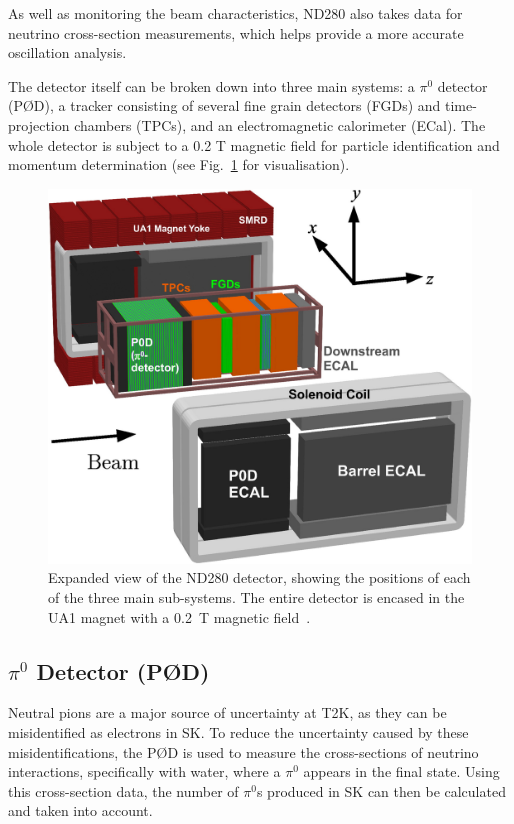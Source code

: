 \documentclass[aps,pra,12pt,notitlepage,tightenlines]{revtex4-1}
\begin{document}
As well as monitoring the beam characteristics, ND280 also takes data for neutrino cross-section measurements, which helps provide a more accurate oscillation analysis. 

The detector itself can be broken down into three main systems: a $\pi^0$ detector (P\O D), a tracker consisting of several fine grain detectors (FGDs) and time-projection chambers (TPCs), and an electromagnetic calorimeter (ECal). The whole detector is subject to a 0.2 T magnetic field for particle identification and momentum determination (see Fig.\ \ref{fig:ND} for visualisation).
\begin{figure}
 \includegraphics[scale=1]{ND280.png}
 \caption{Expanded view of the ND280 detector, showing the positions of each of the three main sub-systems. The entire detector is encased in the UA1 magnet with a 0.2~T magnetic field~\cite{ABE2011106}.}
 \label{fig:ND}
\end{figure} 

\subsection{$\pi^0$ Detector (P\O D)}
Neutral pions are a major source of uncertainty at T2K, as they can be misidentified as electrons in SK. To reduce the uncertainty caused by these misidentifications, the P\O D is used to measure the cross-sections of neutrino interactions, specifically with water, where a $\pi^0$ appears in the final state. Using this cross-section data, the number of $\pi^0$s produced in SK can then be calculated and taken into account.
\end{document}
